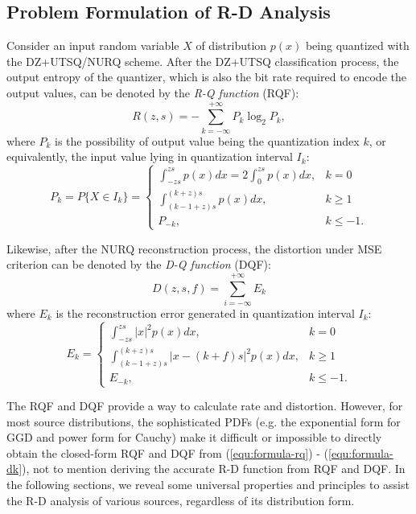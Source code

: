 \documentclass[smallabstract,smallcaptions]{dccpaper}
\begin{document}
\subsection{Problem Formulation of R-D Analysis}

Consider an input random variable $X$ of distribution $p(x)$ being quantized with the DZ+UTSQ/NURQ scheme. After the DZ+UTSQ classification process, the output entropy of the quantizer, which is also the bit rate required to encode the output values, can be denoted by the \emph{R-Q function} (RQF):
\begin{equation}\label{equ:formula-rq}
	R(z, s) = -\sum_{k=-\infty}^{+\infty} P_k \log_2 P_k ,
\end{equation}
where $P_k$ is the possibility of output value being the quantization index $k$, or equivalently, the input value lying in quantization interval $I_{k}$:
\begin{equation}\label{equ:formula-pk}
	P_k = P\{X \in I_k\} =
	\begin{cases}
		\int_{-z s}^{z s} p(x) dx
		= 2 \int_{0}^{z s} p(x) dx,
		& k=0 \\
		\int_{(k-1+z) s}^{(k+z) s} p(x) dx,
		& k \ge 1 \\
		P_{-k},
		& k \le -1 .
	\end{cases}
\end{equation}  

Likewise, after the NURQ reconstruction process, the distortion under MSE criterion can be denoted by the \emph{D-Q function} (DQF):
\begin{equation}\label{equ:formula-dq}
	D(z, s, f) =\sum_{i=-\infty}^{+\infty} E_k
\end{equation}
where $E_k$ is the reconstruction error generated in quantization interval $I_k$:
\begin{equation}\label{equ:formula-dk}
	E_k=
	\begin{cases}
		\int_{-z s}^{z s} |x|^2 p(x) dx,
		& k=0 \\
		\int_{(k-1+z) s}^{(k+z) s} |x - (k+f) s|^2 p(x) dx,
		& k \ge 1 \\
		E_{-k},
		& k \le -1 .
	\end{cases}
\end{equation}

The RQF and DQF provide a way to calculate rate and distortion. However, for most source distributions, the sophisticated PDFs (e.g. the exponential form for GGD and power form for Cauchy) make it difficult or impossible to directly obtain the closed-form RQF and DQF from (\ref{equ:formula-rq}) - (\ref{equ:formula-dk}), not to mention deriving the accurate R-D function from RQF and DQF. In the following sections, we reveal some universal properties and principles to assist the R-D analysis of various sources, regardless of its distribution form.
\end{document}
